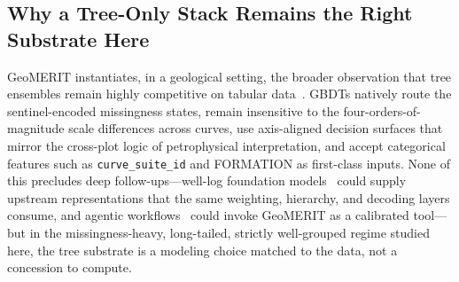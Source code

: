 \documentclass[bdcc,article,submit,pdftex,moreauthors]{Definitions/mdpi}
\begin{document}
\subsection{Why a Tree-Only Stack Remains the Right Substrate Here}
\label{sec:trees}
GeoMERIT instantiates, in a geological setting, the broader observation that tree ensembles
remain highly competitive on tabular
data~\cite{grinsztajn2022trees,shwartzziv2022tabular,mcelfresh2024benchmark}. GBDTs natively
route the sentinel-encoded missingness states, remain insensitive to the
four-orders-of-magnitude scale differences across curves, use axis-aligned decision surfaces
that mirror the cross-plot logic of petrophysical interpretation, and accept categorical
features such as \texttt{curve\_suite\_id} and FORMATION as first-class inputs. None of
this precludes deep follow-ups---well-log foundation models~\cite{qi2025wlfm} could supply
upstream representations that the same weighting, hierarchy, and decoding layers consume,
and agentic workflows~\cite{wang2026geodecider} could invoke GeoMERIT as a calibrated
tool---but in the missingness-heavy, long-tailed, strictly well-grouped regime studied here,
the tree substrate is a modeling choice matched to the data, not a concession to compute.
\end{document}
